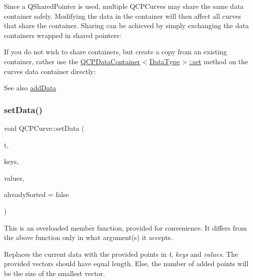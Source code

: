 Since a Q\+Shared\+Pointer is used, multiple Q\+C\+P\+Curves may share the same data container safely. Modifying the data in the container will then affect all curves that share the container. Sharing can be achieved by simply exchanging the data containers wrapped in shared pointers\+: 
\begin{DoxyCodeInclude}
\end{DoxyCodeInclude}
 If you do not wish to share containers, but create a copy from an existing container, rather use the \hyperlink{classQCPDataContainer_ae7042bd534fc3ce7befa2ce3f790b5bf}{Q\+C\+P\+Data\+Container$<$\+Data\+Type$>$\+::set} method on the curve\textquotesingle{}s data container directly\+: 
\begin{DoxyCodeInclude}
\end{DoxyCodeInclude}
 \begin{DoxySeeAlso}{See also}
\hyperlink{classQCPCurve_a73edf394b94f3f24f07518e30565a07f}{add\+Data} 
\end{DoxySeeAlso}
\mbox{\label{classQCPCurve_a0768af2c33c8dcffa3cf5bdeb53923a6}} 
\subsubsection{\texorpdfstring{set\+Data()}{setData()}\hspace{0.1cm}{\footnotesize\ttfamily [2/3]}}
{\footnotesize\ttfamily void Q\+C\+P\+Curve\+::set\+Data (\begin{DoxyParamCaption}\item[{const Q\+Vector$<$ double $>$ \&}]{t,  }\item[{const Q\+Vector$<$ double $>$ \&}]{keys,  }\item[{const Q\+Vector$<$ double $>$ \&}]{values,  }\item[{bool}]{already\+Sorted = {\ttfamily false} }\end{DoxyParamCaption})}

This is an overloaded member function, provided for convenience. It differs from the above function only in what argument(s) it accepts.

Replaces the current data with the provided points in {\itshape t}, {\itshape keys} and {\itshape values}. The provided vectors should have equal length. Else, the number of added points will be the size of the smallest vector.

